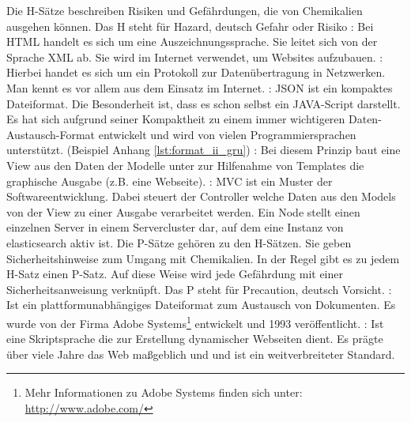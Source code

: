 \begin{acronym}
  Die H-Sätze beschreiben Risiken und Gefährdungen, die von 
 Chemikalien ausgehen können. Das H steht für Hazard, deutsch Gefahr oder Risiko
 : Bei HTML handelt es sich um eine
 Auszeichnungssprache. Sie leitet sich von der Sprache XML ab. Sie wird im
 Internet verwendet, um Websites aufzubauen.
 : Hierbei handet es sich um ein
 Protokoll zur Datenübertragung in Netzwerken. Man kennt es vor allem aus dem
 Einsatz im Internet.
 : JSON ist ein kompaktes Dateiformat.
 Die Besonderheit ist, dass es schon selbst ein JAVA-Script darstellt. Es hat
 sich aufgrund seiner Kompaktheit zu einem immer wichtigeren
 Daten-Austausch-Format entwickelt und wird von vielen Programmiersprachen
 unterstützt. (Beispiel Anhang \ref{lst:format_ii_gru})
 : Bei diesem Prinzip baut eine View aus den
 Daten der Modelle unter zur Hilfenahme von Templates die graphische Ausgabe
 (z.B. eine Webseite).
 : MVC ist ein Muster der Softwareentwicklung.
 Dabei steuert der Controller welche Daten aus den Models von der View zu
 einer Ausgabe verarbeitet werden.
  Ein Node stellt einen einzelnen Server in einem Servercluster
 dar, auf dem eine Instanz von elasticsearch aktiv ist.
  Die P-Sätze gehören zu den H-Sätzen.
 Sie geben Sicherheitshinweise zum Umgang mit Chemikalien. In der Regel gibt es zu jedem
 H-Satz einen P-Satz. Auf diese Weise wird jede Gefährdung mit einer
 Sicherheitsanweisung verknüpft. Das P steht für Precaution, deutsch Vorsicht.
 : Ist ein plattformunabhängiges Dateiformat
 zum Austausch von Dokumenten. Es wurde von der Firma Adobe
 Systems\footnote{Mehr Informationen zu Adobe Systems finden sich unter:
 \url{http://www.adobe.com/}} entwickelt und 1993 veröffentlicht.
  : Ist eine Skriptsprache die zur
  Erstellung dynamischer Webseiten dient. Es prägte über viele Jahre das Web
  maßgeblich und und ist ein weitverbreiteter Standard.

\end{acronym}

